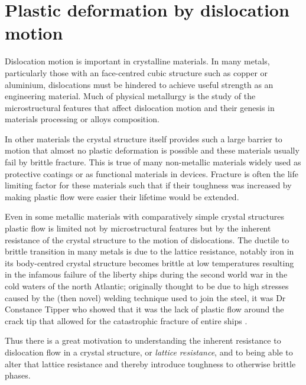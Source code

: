 
\chapter{Plastic deformation by dislocation motion}  %


\graphicspath{{Chapter1/Figs/Vector/}{Chapter1/Figs/Raster/}{Chapter1/Figs/PDF/}{Chapter1/Figs/}}


Dislocation motion is important in crystalline materials. In many metals, particularly those with an face-centred cubic structure such as copper or aluminium, dislocations must be hindered to achieve useful strength as an engineering material. Much of physical metallurgy is the study of the microstructural features that affect dislocation motion and their genesis in materials processing or alloys composition.

In other materials the crystal structure itself provides such a large barrier to motion that almost no plastic deformation is possible and these materials usually fail by brittle fracture. This is true of many non-metallic materials widely used as protective coatings or as functional materials in devices. Fracture is often the life limiting factor for these materials such that if their toughness was increased by making plastic flow were easier their lifetime would be extended. 

Even in some metallic materials with comparatively simple crystal structures plastic flow is limited not by microstructural features but by the inherent resistance of the crystal structure to the motion of dislocations. The ductile to brittle transition in many metals is due to the lattice resistance, notably iron in its body-centred crystal structure becomes brittle at low temperatures resulting in the infamous failure of the liberty ships during the second world war in the cold waters of the north Atlantic; originally thought to be due to high stresses caused by the (then novel) welding technique used to join the steel, it was Dr Constance Tipper who showed that it was the lack of plastic flow around the crack tip that allowed for the catastrophic fracture of entire ships \cite{Cottrell1997}. 

Thus there is a great motivation to understanding the inherent resistance to dislocation flow in a crystal structure, or \emph{lattice resistance}, and to being able to alter that lattice resistance and thereby introduce toughness to otherwise brittle phases.


